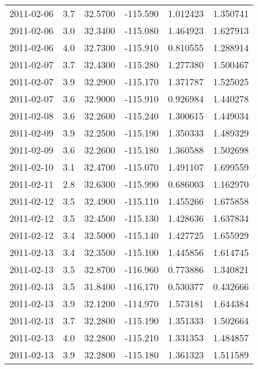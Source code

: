 \begin{tabular}{lrrrrr}
2011-02-06 &       3.7 &  32.5700 &  -115.590 &         1.012423 &         1.350741 \\
2011-02-06 &       3.0 &  32.3400 &  -115.080 &         1.464923 &         1.627913 \\
2011-02-06 &       4.0 &  32.7300 &  -115.910 &         0.810555 &         1.288914 \\
2011-02-07 &       3.7 &  32.4300 &  -115.280 &         1.277380 &         1.500467 \\
2011-02-07 &       3.9 &  32.2900 &  -115.170 &         1.371787 &         1.525025 \\
2011-02-07 &       3.6 &  32.9000 &  -115.910 &         0.926984 &         1.440278 \\
2011-02-08 &       3.6 &  32.2600 &  -115.240 &         1.300615 &         1.449034 \\
2011-02-09 &       3.9 &  32.2500 &  -115.190 &         1.350333 &         1.489329 \\
2011-02-09 &       3.6 &  32.2600 &  -115.180 &         1.360588 &         1.502698 \\
2011-02-10 &       3.1 &  32.4700 &  -115.070 &         1.491107 &         1.699559 \\
2011-02-11 &       2.8 &  32.6300 &  -115.990 &         0.686003 &         1.162970 \\
2011-02-12 &       3.5 &  32.4900 &  -115.110 &         1.455266 &         1.675858 \\
2011-02-12 &       3.5 &  32.4500 &  -115.130 &         1.428636 &         1.637834 \\
2011-02-12 &       3.4 &  32.5000 &  -115.140 &         1.427725 &         1.655929 \\
2011-02-13 &       3.4 &  32.3500 &  -115.100 &         1.445856 &         1.614745 \\
2011-02-13 &       3.5 &  32.8700 &  -116.960 &         0.773886 &         1.340821 \\
2011-02-13 &       3.5 &  31.8400 &  -116.170 &         0.530377 &         0.432666 \\
2011-02-13 &       3.9 &  32.1200 &  -114.970 &         1.573181 &         1.644384 \\
2011-02-13 &       3.7 &  32.2800 &  -115.190 &         1.351333 &         1.502664 \\
2011-02-13 &       4.0 &  32.2800 &  -115.210 &         1.331353 &         1.484857 \\
2011-02-13 &       3.9 &  32.2800 &  -115.180 &         1.361323 &         1.511589 \\

\end{tabular}
